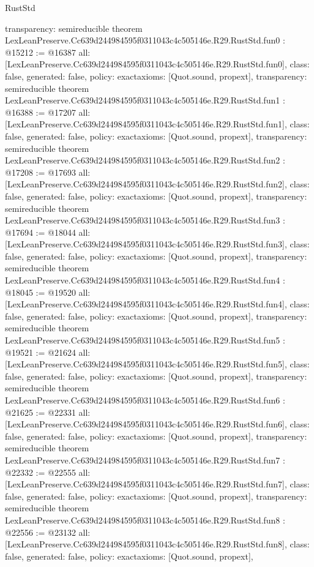 \begin{lexlean}{RustStd}
\begin{coremodule}
{  transparency: semireducible
}
theorem LexLeanPreserve.Cc639d244984595f0311043c4c505146e.R29.RustStd.fun0 : @15212 := @16387 {
  all: [LexLeanPreserve.Cc639d244984595f0311043c4c505146e.R29.RustStd.fun0],
  class: false,
  generated: false,
  policy: exact{axioms: [Quot.sound, propext]},
  transparency: semireducible
}
theorem LexLeanPreserve.Cc639d244984595f0311043c4c505146e.R29.RustStd.fun1 : @16388 := @17207 {
  all: [LexLeanPreserve.Cc639d244984595f0311043c4c505146e.R29.RustStd.fun1],
  class: false,
  generated: false,
  policy: exact{axioms: [Quot.sound, propext]},
  transparency: semireducible
}
theorem LexLeanPreserve.Cc639d244984595f0311043c4c505146e.R29.RustStd.fun2 : @17208 := @17693 {
  all: [LexLeanPreserve.Cc639d244984595f0311043c4c505146e.R29.RustStd.fun2],
  class: false,
  generated: false,
  policy: exact{axioms: [Quot.sound, propext]},
  transparency: semireducible
}
theorem LexLeanPreserve.Cc639d244984595f0311043c4c505146e.R29.RustStd.fun3 : @17694 := @18044 {
  all: [LexLeanPreserve.Cc639d244984595f0311043c4c505146e.R29.RustStd.fun3],
  class: false,
  generated: false,
  policy: exact{axioms: [Quot.sound, propext]},
  transparency: semireducible
}
theorem LexLeanPreserve.Cc639d244984595f0311043c4c505146e.R29.RustStd.fun4 : @18045 := @19520 {
  all: [LexLeanPreserve.Cc639d244984595f0311043c4c505146e.R29.RustStd.fun4],
  class: false,
  generated: false,
  policy: exact{axioms: [Quot.sound, propext]},
  transparency: semireducible
}
theorem LexLeanPreserve.Cc639d244984595f0311043c4c505146e.R29.RustStd.fun5 : @19521 := @21624 {
  all: [LexLeanPreserve.Cc639d244984595f0311043c4c505146e.R29.RustStd.fun5],
  class: false,
  generated: false,
  policy: exact{axioms: [Quot.sound, propext]},
  transparency: semireducible
}
theorem LexLeanPreserve.Cc639d244984595f0311043c4c505146e.R29.RustStd.fun6 : @21625 := @22331 {
  all: [LexLeanPreserve.Cc639d244984595f0311043c4c505146e.R29.RustStd.fun6],
  class: false,
  generated: false,
  policy: exact{axioms: [Quot.sound, propext]},
  transparency: semireducible
}
theorem LexLeanPreserve.Cc639d244984595f0311043c4c505146e.R29.RustStd.fun7 : @22332 := @22555 {
  all: [LexLeanPreserve.Cc639d244984595f0311043c4c505146e.R29.RustStd.fun7],
  class: false,
  generated: false,
  policy: exact{axioms: [Quot.sound, propext]},
  transparency: semireducible
}
theorem LexLeanPreserve.Cc639d244984595f0311043c4c505146e.R29.RustStd.fun8 : @22556 := @23132 {
  all: [LexLeanPreserve.Cc639d244984595f0311043c4c505146e.R29.RustStd.fun8],
  class: false,
  generated: false,
  policy: exact{axioms: [Quot.sound, propext]},
}
\end{coremodule}
\end{lexlean}
